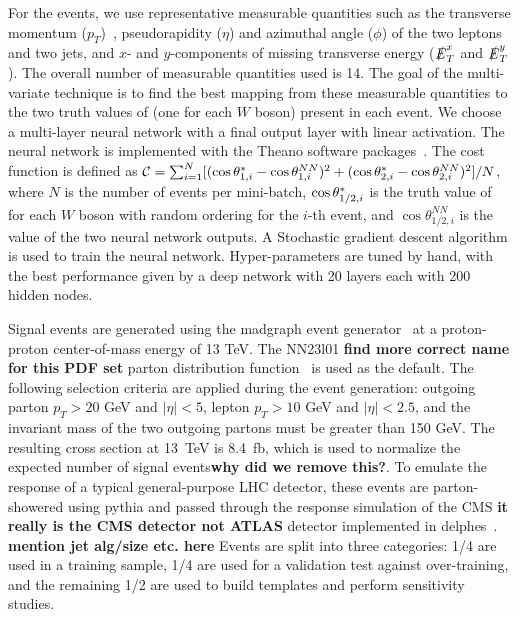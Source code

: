 For the \ssWW events, we use representative measurable quantities such
as the transverse momentum ($p_T$)~\cite{coordinate}, pseudorapidity ($\eta$) and
azimuthal angle ($\phi$) of the two leptons and two jets, and $x$- and $y$-components 
of missing transverse energy ($\slashed{E}_T^x$ and
$\slashed{E}_T^y$).  The overall number of measurable quantities used is 14. 
The goal of the multi-variate technique is to find
the best mapping from these measurable quantities to the two truth
values of \cts (one for each $W$ boson) present in each event.  We
choose a multi-layer neural network with a final output layer with
linear activation. The neural network is implemented with the Theano
software packages~\cite{theano1,theano2}. The cost function is defined as 
${\cal{C}}= \sum_{i=1}^{N} [(\ctsnb_{1,i} -\cos \theta^{NN}_{1,i})^2+(\ctsnb_{2,i}-\cos \theta^{NN}_{2,i})^2]/N$, 
where $N$ is the number of events per mini-batch,
$ \cos  \theta^{*}  _{1/2,i}$ is the truth value of \cts for each $W$ boson with
random ordering for the $i$-th event, and $\cos \theta^{NN}_{1/2, i}$ is the value of
the two neural network outputs. A Stochastic gradient descent
algorithm is used to train the neural network. Hyper-parameters are tuned by hand,
with the best performance given by a deep network with 20 layers each with 200 hidden nodes.  

Signal \ssWW events are generated using the {\sc madgraph} event generator~\cite{madgraph} at a proton-proton center-of-mass energy of 13 TeV.  
The NN23l01 {\bf find more correct name for this PDF set} parton distribution function~\cite{pdf} is used as the default. 
The following selection criteria are applied during the event generation: outgoing parton $p_T > 20$ GeV and $|\eta| < 5$, 
lepton $p_T > 10$ GeV and $|\eta| < 2.5$, and the invariant mass of the two outgoing partons must be greater than 150 GeV. The resulting cross section at 13~TeV is 8.4~fb, which is used to normalize the expected number of signal events{\bf why did we remove this?}.
To emulate the response of a typical general-purpose LHC detector, these events are parton-showered using {\sc pythia}\cite{pythia} and passed through the 
response simulation of the CMS {\bf it really is the CMS detector not ATLAS} detector implemented in {\sc delphes}~\cite{delphes}. {\bf mention jet alg/size etc. here} Events
are split into three categories: 1/4 are used in a training sample,
1/4 are used for a validation test against over-training, and the
remaining 1/2 are used to build templates and perform sensitivity
studies.%

